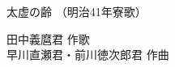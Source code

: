 \documentclass[10pt,b5j]{tarticle} %
\begin{document}
\begin{minipage}[c]{0.7\hsize} %
    \begin{center}
        {\LARGE
            太虚の齢 %
        }
        {\small 
            （明治41年寮歌） %
        }
    \end{center}
\end{minipage}
\begin{minipage}[c]{0.3\hsize} %
    \begin{flushright} %
        田中義麿君 作歌\\早川直瀬君・前川徳次郎君 作曲 %
    \end{flushright}
\end{minipage}
\end{document}
